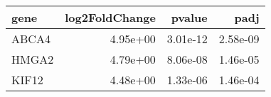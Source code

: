 \begin{tabular}{lrrr}
\toprule
 gene &  log2FoldChange &   pvalue &     padj \\
\midrule
ABCA4 &        4.95e+00 & 3.01e-12 & 2.58e-09 \\
HMGA2 &        4.79e+00 & 8.06e-08 & 1.46e-05 \\
KIF12 &        4.48e+00 & 1.33e-06 & 1.46e-04 \\
\bottomrule
\end{tabular}
